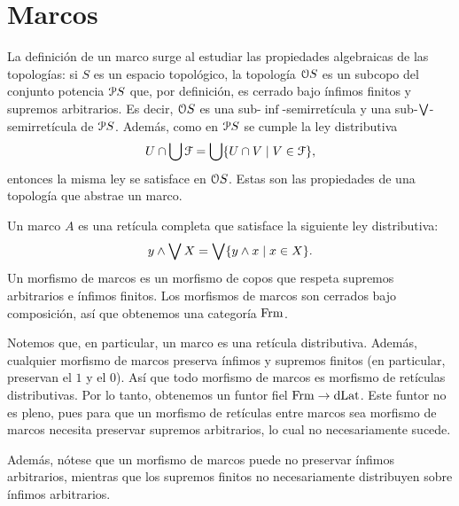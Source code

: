 \section{Marcos}
La definición de un marco surge al estudiar las propiedades
algebraicas de las topologías:
si $S$ es un espacio topológico, la topología $\cal OS$ es
un subcopo del conjunto potencia $\cal PS$ que,
por definición, es cerrado bajo ínfimos finitos y
supremos arbitrarios. Es decir, $\cal OS$ es una
sub-$\inf$-semirretícula y una sub-$\Sup$-semirretícula de $\cal
PS$.
Además, como en $\cal PS$ se cumple la ley distributiva
\begin{equation}
  U\cap\bigcup \cal F=\bigcup\{U\cap V\mid V\in\cal F\},
\end{equation}
entonces la misma ley se satisface en $\cal OS$.
Estas son las propiedades de una topología que abstrae un marco.

\begin{definition}
  Un marco $A$ es una retícula completa que satisface la siguiente
  ley distributiva:
  \[
      y\inf\Sup X = \Sup\{y\inf x\mid x\in X\}
  .\]
  Un morfismo de marcos es un morfismo de copos que respeta
  supremos arbitrarios e ínfimos finitos.
  Los morfismos de marcos son cerrados
  bajo composición, así que obtenemos una categoría $\Frm$.
\end{definition}

Notemos que, en particular, un marco es una retícula distributiva.
Además, cualquier morfismo de marcos preserva ínfimos y supremos
finitos (en particular, preservan el $1$ y el $0$). Así que todo
morfismo de marcos es morfismo de retículas distributivas. Por lo
tanto, obtenemos un funtor fiel $\Frm\to\DLat$. Este funtor no es
pleno, pues para que un morfismo de retículas entre marcos sea
morfismo de marcos necesita preservar supremos arbitrarios, lo cual no
necesariamente sucede.

Además, nótese que un morfismo de marcos puede no preservar ínfimos
arbitrarios, mientras que los supremos finitos no necesariamente
distribuyen sobre ínfimos arbitrarios.

